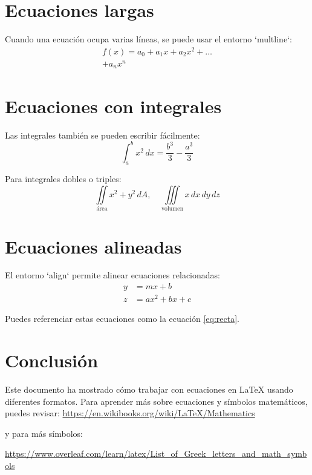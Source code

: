 \documentclass[12pt]{article}
\begin{document}
\section{Ecuaciones largas}
Cuando una ecuación ocupa varias líneas, se puede usar el entorno `multline`:
\begin{multline}
f(x) = a_0 + a_1x + a_2x^2 + \dots \\
+ a_nx^n
\end{multline}

\section{Ecuaciones con integrales}
Las integrales también se pueden escribir fácilmente:
\begin{equation}
\int_{a}^{b} x^2 \, dx = \frac{b^3}{3} - \frac{a^3}{3}
\end{equation}

Para integrales dobles o triples:
\[
\iint\limits_{\text{área}} x^2 + y^2 \, dA, \quad \iiint\limits_{\text{volumen}} x \, dx \, dy \, dz
\]

\section{Ecuaciones alineadas}
El entorno `align` permite alinear ecuaciones relacionadas:
\begin{align}
y &= mx + b \label{eq:recta} \\
z &= ax^2 + bx + c
\end{align}

Puedes referenciar estas ecuaciones como la ecuación \eqref{eq:recta}.

\section*{Conclusión}
Este documento ha mostrado cómo trabajar con ecuaciones en \LaTeX{} usando diferentes formatos. Para aprender más sobre ecuaciones y símbolos matemáticos, puedes revisar: \url{https://en.wikibooks.org/wiki/LaTeX/Mathematics}

y para más símbolos:

\url{https://www.overleaf.com/learn/latex/List_of_Greek_letters_and_math_symbols}
\end{document}
